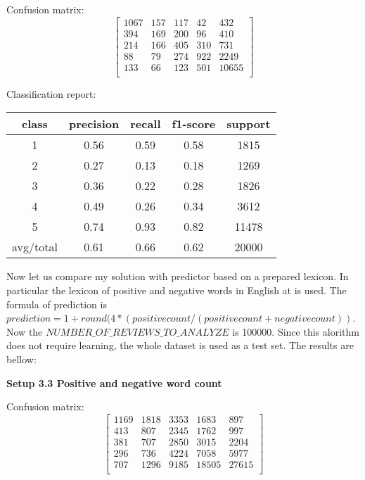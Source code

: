 \documentclass[12pt]{report}
\begin{document}
Confusion matrix:
\[
\begin{bmatrix}
1067 & 157 & 117 & 42 & 432 \\
394 & 169 & 200 & 96 & 410 \\
214 & 166 & 405 & 310 & 731 \\
88 & 79  & 274 & 922 & 2249 \\
133 & 66 & 123 & 501 & 10655 \\
\end{bmatrix}
\]

Classification report:

\begin{center}
	\begin{tabular}{c | c | c | c | c }
		\hline
		class & precision & recall & f1-score & support \\ \hline
		1 & 0.56 & 0.59 & 0.58 & 1815 \\ \hline
		2 & 0.27 & 0.13 & 0.18 & 1269 \\ \hline
		3 & 0.36 & 0.22 & 0.28 & 1826 \\ \hline
		4 & 0.49 & 0.26 & 0.34 & 3612 \\ \hline
		5 & 0.74 & 0.93 & 0.82 & 11478 \\ \hline
		avg/total & 0.61 & 0.66 & 0.62 & 20000 \\ \hline
	\end{tabular}
\end{center}


Now let us compare my solution with predictor based on a prepared lexicon. In particular the lexicon of positive and negative words in English at \cite{pos-neg} is used. The formula of prediction is $prediction = 1 + round(4 * (positive count / (positive count + negative count))$. Now the $NUMBER\_OF\_REVIEWS\_TO\_ANALYZE$ is 100000. Since this alorithm does not require learning, the whole dataset is used as a test set. The results are bellow:

\bigbreak

\textbf{Setup 3.3 Positive and negative word count}

Confusion matrix:
\[
\begin{bmatrix}
1169 & 1818 & 3353 & 1683 & 897 \\
413 & 807 & 2345 & 1762 & 997 \\
381 & 707 & 2850 & 3015 & 2204 \\
296 & 736 & 4224 & 7058 & 5977 \\
707 & 1296 & 9185 & 18505 & 27615 \\
\end{bmatrix}
\]
\end{document}
